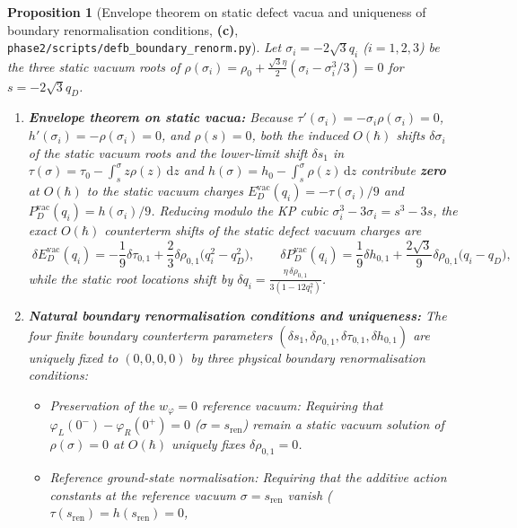 \documentclass[11pt,a4paper]{article}
\newtheorem{proposition}[theorem]{Proposition}
\theoremstyle{remark}
\newcommand{\hb}{\hbar}
\newcommand{\dd}{\mathrm{d}}
\newcommand{\Lc}{\textbf{(c)}}
\newcommand{\sren}{\texttt{phase2/\allowbreak scripts/\allowbreak defb\_\allowbreak boundary\_\allowbreak renorm.py}}
\begin{document}
\begin{proposition}[Envelope theorem on static defect vacua and uniqueness of boundary renormalisation conditions, \Lc, \sren]\label{prop:envelope_uniqueness}
Let $\sigma_i = -2\sqrt{3}q_i$ ($i=1,2,3$) be the three static vacuum roots of
$\rho(\sigma_i) = \rho_0 + \frac{\sqrt{3}\eta}{2}(\sigma_i - \sigma_i^3/3) = 0$
for $s = -2\sqrt{3}q_D$.
\begin{enumerate}
\item \textbf{Envelope theorem on static vacua:}
Because $\tau'(\sigma_i) = -\sigma_i\rho(\sigma_i) = 0$,
$h'(\sigma_i) = -\rho(\sigma_i) = 0$, and $\rho(s) = 0$, both the induced
$O(\hb)$ shifts $\delta\sigma_i$ of the static vacuum roots and the lower-limit
shift $\delta s_1$ in $\tau(\sigma) = \tau_0 - \int_s^\sigma z\rho(z)\,\dd z$
and $h(\sigma) = h_0 - \int_s^\sigma \rho(z)\,\dd z$ contribute \textbf{zero}
at $O(\hb)$ to the static vacuum charges $E_D^{\mathrm{vac}}(q_i) = -\tau(\sigma_i)/9$
and $P_D^{\mathrm{vac}}(q_i) = h(\sigma_i)/9$. Reducing modulo the KP cubic
$\sigma_i^3 - 3\sigma_i = s^3 - 3s$, the exact $O(\hb)$ counterterm shifts of
the static defect vacuum charges are
\begin{equation}\label{eq:exact_vac_shifts}
  \boxed{\;
  \delta E_D^{\mathrm{vac}}(q_i) = -\frac{1}{9}\delta\tau_{0,1} + \frac{2}{3}\delta\rho_{0,1}\big(q_i^2 - q_D^2\big), \qquad
  \delta P_D^{\mathrm{vac}}(q_i) = \frac{1}{9}\delta h_{0,1} + \frac{2\sqrt{3}}{9}\delta\rho_{0,1}\big(q_i - q_D\big),
  \;}
\end{equation}
while the static root locations shift by
$\delta q_i = \frac{\eta\,\delta\rho_{0,1}}{3(1 - 12q_i^2)}$.
\item \textbf{Natural boundary renormalisation conditions and uniqueness:}
The four finite boundary counterterm parameters
$(\delta s_1,\delta\rho_{0,1},\delta\tau_{0,1},\delta h_{0,1})$ are uniquely
fixed to $(0,0,0,0)$ by three physical boundary renormalisation conditions:
\begin{itemize}
\item[(a)] \emph{Preservation of the $w_\varphi = 0$ reference vacuum:}
Requiring that $\varphi_L(0^-) - \varphi_R(0^+) = 0$ ($\sigma = s_{\mathrm{ren}}$)
remain a static vacuum solution of $\rho(\sigma)=0$ at $O(\hb)$ uniquely fixes
$\delta\rho_{0,1} = 0$.
\item[(b)] \emph{Reference ground-state normalisation:}
Requiring that the additive action constants at the reference vacuum
$\sigma = s_{\mathrm{ren}}$ vanish ($\tau(s_{\mathrm{ren}}) = h(s_{\mathrm{ren}}) = 0$,

\end{itemize}
\end{enumerate}
\end{proposition}
\end{document}
